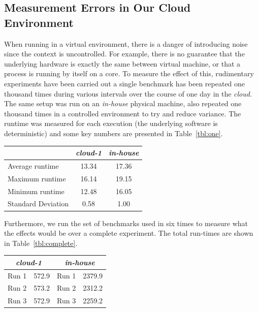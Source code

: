 \documentclass[a4paper]{IEEEtran}
\begin{document}
\subsection{Measurement Errors in Our Cloud Environment}
When running in a virtual environment, there is a danger of
introducing noise since the context is uncontrolled. For example,
there is no guarantee that the underlying hardware is exactly the same
between virtual machine, or that a process is running by itself on a
core. To measure the effect of this, rudimentary experiments have been
carried out a single benchmark has been repeated one thousand times
during various intervals over the course of one day in the
\emph{cloud}. The same setup was run on an \emph{in-house} physical machine,
also repeated one thousand times in a controlled environment to try
and reduce variance. The runtime was measured for each execution (the
underlying software is deterministic) and some key numbers are
presented in Table~\ref{tbl:one}.


\begin{Figure}
  \centering
  \begin{tabular}{|l|c|c|}
    \hline
    & \emph{cloud-1} & \emph{in-house} \\
  \hline
  Average runtime &  13.34 & 17.36\\
  \hline
  Maximum runtime & 16.14 & 19.15 \\
  \hline
  Minimum runtime & 12.48 & 16.05\\
  \hline      
  Standard Deviation & 0.58 & 1.00 \\
  \hline
\end{tabular}
\label{tbl:one}
\end{Figure}

Furthermore, we run the set of benchmarks used in \cite{uppsat} six times to measure what the effects would be over a complete experiment. The total run-times are shown in Table~\ref{tbl:complete}.

\begin{Figure}
  \centering
\begin{tabular}{|l|c|l|c|}
  \hline
  \multicolumn{2}{|c|}{\emph{cloud-1}} & \multicolumn{2}{c|}{\emph{in-house}} \\
  \hline
  Run 1 &  572.9 & Run 1 & 2379.9 \\
  \hline
  Run 2 & 573.2 & Run 2 & 2312.2 \\
  \hline
  Run 3 & 572.9 & Run 3 & 2259.2 \\
  \hline      
\end{tabular}
\label{tbl:complete}
\end{Figure}
\end{document}

